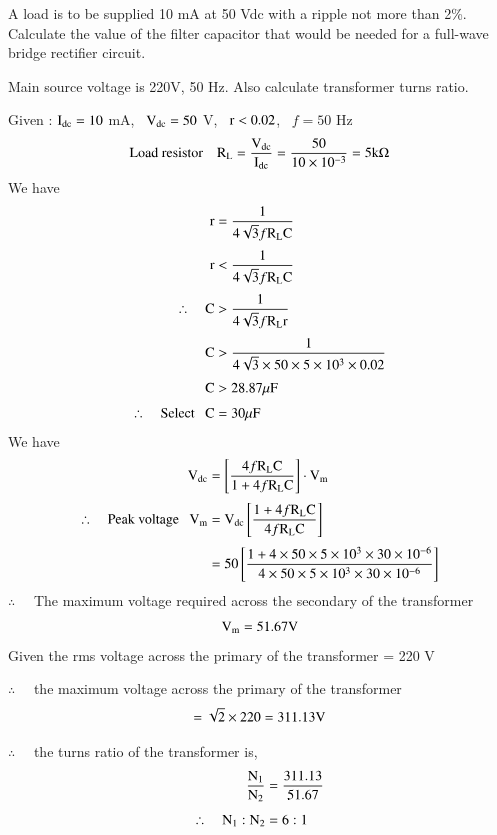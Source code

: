 \begin{problem}\label{prob1.24}
A load is to be supplied 10 mA at 50 Vdc with a ripple not more than 2\%. Calculate the value of the filter capacitor that would be needed for a full-wave bridge rectifier circuit.

Main source voltage is 220V, 50 Hz. Also calculate transformer turns ratio.
\end{problem}

\begin{solution}
Given : $\textrm{I}_{\text{dc}}=10$ mA, \ $\textrm{V}_{\text{dc}}=50$ V, \ $\textrm{r}<0.02$, \ $f=50$ Hz
$$
\text{Load resistor ~~ } \textrm{R}_{\textrm{L}} =\dfrac{\textrm{V}_{\text{dc}}}{\textrm{I}_{\text{dc}}}=\dfrac{50}{10\times 10^{-3}}=5\textrm{k}\Omega
$$
We have
\begin{align*}
\textrm{r} &= \frac{1}{4\sqrt{3}f\textrm{R}_{\textrm{L}}\textrm{C}}\\[3pt]
\textrm{r} &< \dfrac{1}{4\sqrt{3}f\textrm{R}_{\textrm{L}}\textrm{C}}\\[3pt]
\therefore\quad \textrm{C} &> \dfrac{1}{4\sqrt{3}f\textrm{R}_{\textrm{L}}\textrm{r}}\\[3pt]
\textrm{C} &> \dfrac{1}{4\sqrt{3}\times 50\times 5\times 10^{3}\times 0.02}\\[3pt]
\textrm{C} &> 28.87\mu\textrm{F}\\[3pt]
\therefore\quad \text{Select~~ } \textrm{C} &= 30\mu\textrm{F}
\end{align*}
We have
\begin{align*}
\textrm{V}_{\text{dc}} &= \left[\frac{4f\textrm{R}_{\textrm{L}}\textrm{C}}{1+4f\textrm{R}_{\textrm{L}}\textrm{C}}\right]\cdot \textrm{V}_{\textrm{m}}\\[3pt]
\therefore\quad \text{Peak voltage~~ }\textrm{V}_{\textrm{m}} &= \textrm{V}_{\text{dc}}\left[\frac{1+4f\textrm{R}_{\textrm{L}}\textrm{C}}{4f\textrm{R}_{\textrm{L}}\textrm{C}}\right]\\[3pt]
&= 50 \left[\frac{1+4\times 50\times 5\times 10^{3}\times 30\times 10^{-6}}{4\times 50\times 5\times 10^{3}\times 30\times 10^{-6}}\right]
\end{align*}
$\therefore$~~ The maximum voltage required across the secondary of the transformer
$$
\textrm{V}_{\textrm{m}}=51.67\textrm{V}
$$
Given the rms voltage across the primary of the transformer = 220 V

\vfill\eject

$\therefore$~~ the maximum voltage across the primary of the transformer
$$
=\sqrt{2}\times 220=311.13\textrm{V}
$$

$\therefore$~~ the turns ratio of the transformer is,
\begin{align*}
\frac{\textrm{N}_{1}}{\textrm{N}_{2}} &= \frac{311.13}{51.67}\\[4pt]
\therefore\quad \textrm{N}_{1}:\textrm{N}_{2} &= 6:1
\end{align*}
\end{solution}

